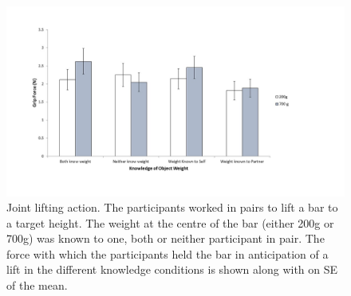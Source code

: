 \begin{figure}[!h]
  \centering
  \includegraphics[width=.8\textwidth]{Roberta/Figures/Figure3.jpg}
  \caption{Joint lifting action. The participants worked in pairs to lift a bar to a target height. The weight at the centre of the bar (either 200g or 700g) was known to one, both or neither participant in pair. The force with which the participants held the bar in anticipation of a lift in the different knowledge conditions is shown along with on SE of the mean.}
  \label{Joint lifting action}
\end{figure}
